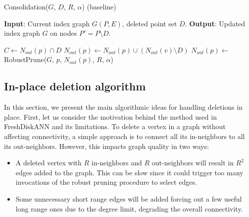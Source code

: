 \begin{algorithm}
\caption{Consolidation($G$, $D$, $R$, $\alpha$) (baseline)}
\label{alg:consolidation_baseline}
\begin{algorithmic}[1]
\State \textbf{Input}: Current index graph $G(P,E)$, deleted point set $D$.
\State \textbf{Output}: Updated index graph $G$ on nodes $P'=P\setminus D$.

    \State $C\gets N_{out}(p)\cap D$
        \State $N_{out}(p)\gets N_{out}(p) \cup (N_{out}(v)\setminus D)$ 
    \EndFor
    \State $N_{out}(p)\gets$ RobustPrune($G$, $p$, $N_{out}(p)$, $R$, $\alpha$)
\EndFor

\end{algorithmic}
\end{algorithm}



\subsection{In-place deletion algorithm}

In this section, we present the main algorithmic ideas for handling deletions in place.
First, let us consider the motivation behind the method used in FreshDiskANN and its limitations.
To delete a vertex in a graph without affecting connectivity, a simple approach is to
connect all its in-neighbors to all its out-neighbors. However, this impacts graph quality in two ways:

\begin{itemize}
\item  A deleted vertex with $R$ in-neighbors and $R$ out-neighbors
will result in $R^2$ edges added to the graph. This can be slow since it 
could trigger too many invocations of the robust pruning procedure to select edges. 
\item Some unnecessary short range edges will be added forcing out a few useful long range ones
due to the degree limit, degrading the overall connectivity.
\end{itemize}

